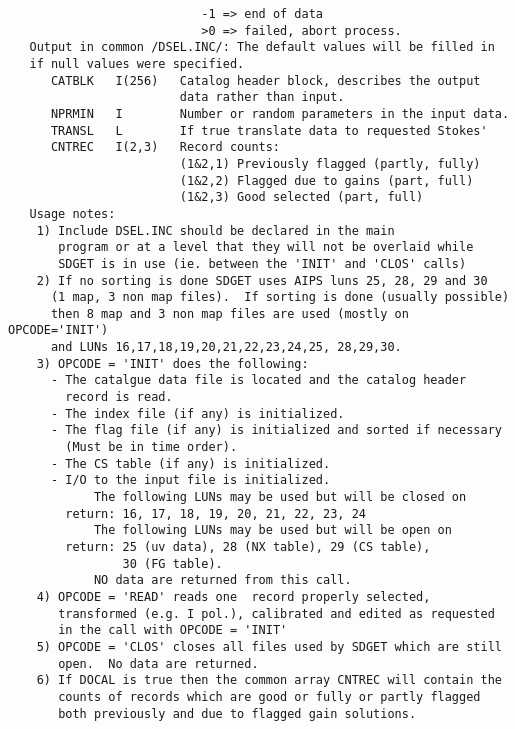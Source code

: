 \begin{verbatim}
                           -1 => end of data
                           >0 => failed, abort process.
   Output in common /DSEL.INC/: The default values will be filled in
   if null values were specified.
      CATBLK   I(256)   Catalog header block, describes the output
                        data rather than input.
      NPRMIN   I        Number or random parameters in the input data.
      TRANSL   L        If true translate data to requested Stokes'
      CNTREC   I(2,3)   Record counts:
                        (1&2,1) Previously flagged (partly, fully)
                        (1&2,2) Flagged due to gains (part, full)
                        (1&2,3) Good selected (part, full)
   Usage notes:
    1) Include DSEL.INC should be declared in the main
       program or at a level that they will not be overlaid while
       SDGET is in use (ie. between the 'INIT' and 'CLOS' calls)
    2) If no sorting is done SDGET uses AIPS luns 25, 28, 29 and 30
      (1 map, 3 non map files).  If sorting is done (usually possible)
      then 8 map and 3 non map files are used (mostly on OPCODE='INIT')
      and LUNs 16,17,18,19,20,21,22,23,24,25, 28,29,30.
    3) OPCODE = 'INIT' does the following:
      - The catalgue data file is located and the catalog header
        record is read.
      - The index file (if any) is initialized.
      - The flag file (if any) is initialized and sorted if necessary
        (Must be in time order).
      - The CS table (if any) is initialized.
      - I/O to the input file is initialized.
            The following LUNs may be used but will be closed on
        return: 16, 17, 18, 19, 20, 21, 22, 23, 24
            The following LUNs may be used but will be open on
        return: 25 (uv data), 28 (NX table), 29 (CS table),
                30 (FG table).
            NO data are returned from this call.
    4) OPCODE = 'READ' reads one  record properly selected,
       transformed (e.g. I pol.), calibrated and edited as requested
       in the call with OPCODE = 'INIT'
    5) OPCODE = 'CLOS' closes all files used by SDGET which are still
       open.  No data are returned.
    6) If DOCAL is true then the common array CNTREC will contain the
       counts of records which are good or fully or partly flagged
       both previously and due to flagged gain solutions.
\end{verbatim}

